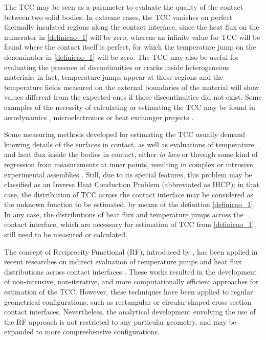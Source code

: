\documentclass[12pt]{CHT-20}
\begin{document}
The TCC may be seen as a parameter to evaluate the quality of the contact between two solid bodies. In extreme cases, the TCC vanishes on perfect thermally insulated regions along the contact interface, since the heat flux on the numerator in \eqref{definicao_1} will be zero, whereas an infinite value for TCC will be found where the contact itself is perfect, for which the temperature jump on the denominator in \eqref{definicao_1} will be zero. The TCC may also be useful for evaluating the presence of discontinuities or cracks inside heterogeneous materials; in fact, temperature jumps appear at those regions and the temperature fields measured on the external boundaries of the material will show values different from the expected ones if those discontinuities did not exist. Some examples of the necessity of calculating or estimating the TCC may be found in aerodynamics \citep{artigo_aerospacial}, microelectronics \citep{artigo_snaith} or heat exchanger projects \citep{artigo_huang}. 

Some measuring methods developed for estimating the TCC usually demand knowing details of the surfaces in contact, as well as evaluations of temperature and heat flux inside the bodies in contact, either \textit{in loco} or through some kind of regression from measurements at inner points, resulting in complex or intrusive experimental assemblies \citep{artigo_fenech, tese_mikic, artigo_beck, artigo_salgon}. Still, due to its special features, this problem may be classified as an Inverse Heat Conduction Problem (abbreviated as IHCP); in that case, the distribution of TCC across the contact interface may be considered as the unknown function to be estimated, by means of the definition \eqref{definicao_1}. In any case, the distributions of heat flux and temperature jumps across the contact interface, which are necessary for estimation of TCC from \eqref{definicao_1}, still need to be measured or calculated.

The concept of Reciprocity Functional (RF), introduced by \cite{artigo_andrieux}, has been applied in recent researches on indirect evaluation of temperature jumps and heat flux distributions across contact interfaces \citep{reciproc_3, artigo_colaco_2, artigo_colaco_3, artigo_abreu_2,artigo_abreu_3, artigo_padilha_2}. These works resulted in the development of non-intrusive, non-iterative, and more computationally efficient approaches for estimation of the TCC. However, these techniques have been applied to regular geometrical configurations, such as rectangular or circular-shaped cross section contact interfaces. Nevertheless, the analytical development envolving the use of the RF approach is not restricted to any particular geometry, and may be expanded to more compreehensive configurations.
\end{document}
